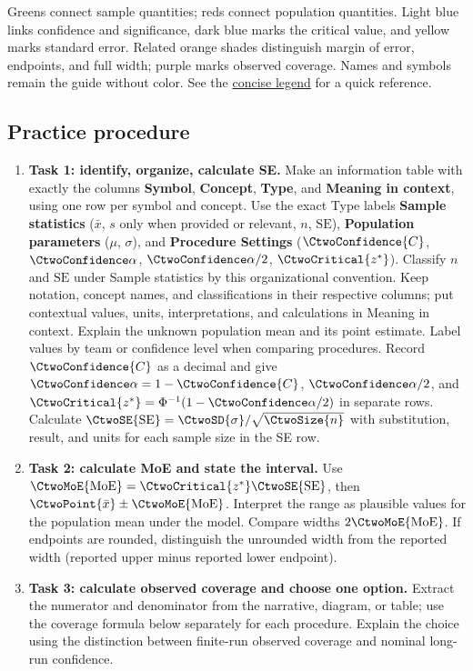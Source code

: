 Greens connect sample quantities; reds connect population quantities. Light blue links confidence and significance, dark blue marks the critical value, and yellow marks standard error. Related orange shades distinguish margin of error, endpoints, and full width; purple marks observed coverage. Names and symbols remain the guide without color. See the \hyperref[tab:highlight-legend]{concise legend} for a quick reference.

\clearpage
\subsection{Practice procedure}

\begin{enumerate}
    \item \textbf{Task 1: identify, organize, calculate SE.} Make an information table with exactly the columns \textbf{Symbol}, \textbf{Concept}, \textbf{Type}, and \textbf{Meaning in context}, using one row per symbol and concept. Use the exact Type labels \textbf{Sample statistics} ($\bar{x}$, $s$ only when provided or relevant, $n$, $\mathrm{SE}$), \textbf{Population parameters} ($\mu$, $\sigma$), and \textbf{Procedure Settings} ($\CtwoConfidence{C}$, $\CtwoSignificance{\alpha}$, $\CtwoSignificance{\alpha}/2$, $\CtwoCritical{z^*}$). Classify $n$ and $\mathrm{SE}$ under Sample statistics by this organizational convention. Keep notation, concept names, and classifications in their respective columns; put contextual values, units, interpretations, and calculations in Meaning in context. Explain the unknown population mean and its point estimate. Label values by team or confidence level when comparing procedures. Record $\CtwoConfidence{C}$ as a decimal and give $\CtwoSignificance{\alpha}=1-\CtwoConfidence{C}$, $\CtwoSignificance{\alpha}/2$, and $\CtwoCritical{z^*}=\Phi^{-1}(1-\CtwoSignificance{\alpha}/2)$ in separate rows. Calculate $\CtwoSE{\mathrm{SE}}=\CtwoSD{\sigma}/\sqrt{\CtwoSize{n}}$ with substitution, result, and units for each sample size in the SE row.
    \item \textbf{Task 2: calculate MoE and state the interval.} Use $\CtwoMoE{\mathrm{MoE}}=\CtwoCritical{z^*}\CtwoSE{\mathrm{SE}}$, then $\CtwoPoint{\bar{x}}\pm\CtwoMoE{\mathrm{MoE}}$. Interpret the range as plausible values for the population mean under the model. Compare widths $2\CtwoMoE{\mathrm{MoE}}$. If endpoints are rounded, distinguish the unrounded width from the reported width (reported upper minus reported lower endpoint).
    \item \textbf{Task 3: calculate observed coverage and choose one option.} Extract the numerator and denominator from the narrative, diagram, or table; use the coverage formula below separately for each procedure. Explain the choice using the distinction between finite-run observed coverage and nominal long-run confidence.
\end{enumerate}


